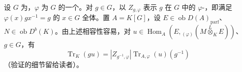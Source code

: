 设 $G$ 为，$\varphi$ 为 $G$ 的一个。对 $g\in G$，以 $Z_{g,\varphi}$ 表示 $g$ 在 $G$ 中的 $\varphi$-，即满足 $\varphi(x)gx^{-1}=g$ 的 $x\in G$ 全体。置 $A=K[G]$，设 $E\in\operatorname{ob}D(A)_{\mathrm{parf}}$、$N\in\operatorname{ob}D^b(K)$。由上述相容性容易，对 $u\in\operatorname{Hom}_A(E,{}_{(\varphi)}(M\overset L\otimes_K E))$、$g\in G$，有
\begin{equation}\operatorname{Tr}_K(gu)=|Z_{g^{-1},\varphi}|\operatorname{Tr}_{A,\varphi}(u)(g^{-1})\tag{5.13.5}\end{equation}
（验证的细节留给读者）。
